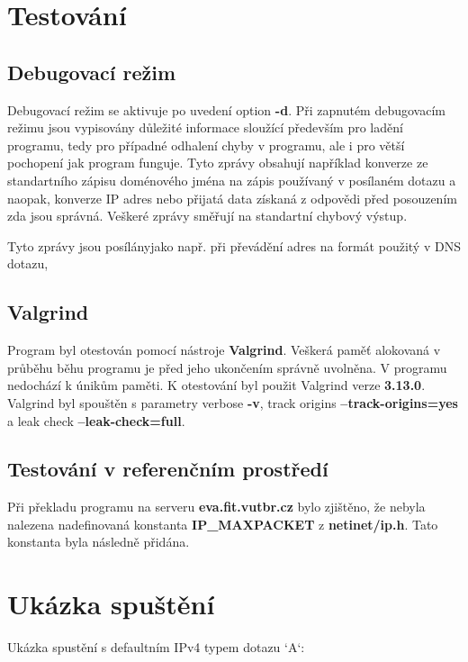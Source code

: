 \documentclass[a4paper,11pt]{article}
\begin{document}
\section{Testování}

\subsection{Debugovací režim}

Debugovací režim se aktivuje po uvedení option \textbf{-d}. Při zapnutém debugovacím režimu jsou vypisovány důležité informace sloužící především pro ladění programu, tedy pro případné odhalení chyby v programu, ale i pro větší pochopení jak program funguje. Tyto zprávy obsahují například konverze ze standartního zápisu doménového jména na zápis používaný v posílaném dotazu a naopak, konverze IP adres nebo přijatá data získaná z odpovědi před posouzením zda jsou správná. Veškeré zprávy směřují na standartní chybový výstup.

Tyto zprávy jsou posílányjako např. při převádění adres na formát použitý v DNS dotazu, 

\subsection{Valgrind}

Program byl otestován pomocí nástroje \textbf{Valgrind}. Veškerá paměť alokovaná v průběhu běhu programu je před jeho ukončením správně uvolněna. V programu nedochází k únikům paměti. K otestování byl použit Valgrind verze \textbf{3.13.0}. Valgrind byl spouštěn s parametry verbose \textbf{-v}, track origins \textbf{--track-origins=yes} a leak check \textbf{--leak-check=full}.

\subsection{Testování v referenčním prostředí}

Při překladu programu na serveru \textbf{eva.fit.vutbr.cz} bylo zjištěno, že nebyla nalezena nadefinovaná konstanta \textbf{IP\_MAXPACKET} z \textbf{netinet/ip.h}. Tato konstanta byla následně přidána.

\section{Ukázka spuštění}

Ukázka spustění s defaultním IPv4 typem dotazu `A`:
\end{document}
